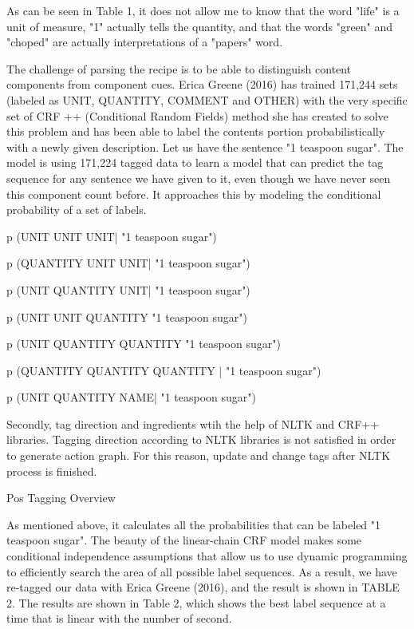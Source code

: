 As can be seen in Table 1, it does not allow me to know that the word "life" is a unit of measure, "1" actually tells the quantity, and that the words "green" and "choped" are actually interpretations of a "papers" word.

The challenge of parsing the recipe is to be able to distinguish content components from component cues. Erica Greene (2016) has trained 171,244 sets (labeled as UNIT, QUANTITY, COMMENT and OTHER) with the very specific set of CRF ++\cite{crf} (Conditional Random Fields) method she has created to solve this problem and has been able to label the contents portion probabilistically with a newly given description. Let us have the sentence "1 teaspoon sugar". The model is using 171,224 tagged data to learn a model that can predict the tag sequence for any sentence we have given to it, even though we have never seen this component count before. It approaches this by modeling the conditional probability of a set of labels.

p (UNIT UNIT UNIT| "1 teaspoon sugar")

p (QUANTITY UNIT UNIT| "1 teaspoon sugar")

p (UNIT QUANTITY UNIT| "1 teaspoon sugar")

p (UNIT UNIT QUANTITY "1 teaspoon sugar")

p (UNIT QUANTITY QUANTITY "1 teaspoon sugar")

p (QUANTITY QUANTITY QUANTITY | "1 teaspoon sugar")

p (UNIT QUANTITY NAME| "1 teaspoon sugar")

Secondly, tag direction and ingredients wtih the help of NLTK \cite{nltk} and CRF++\cite{crf} libraries. Tagging direction according to NLTK \cite{nltk} libraries is not satisfied in order to generate  action graph. For this reason, update and change tags after NLTK \cite{nltk} process is finished. 

\begin{algorithm}
\caption{Pos Tagging Overview}
\label{alg:generator}

\end{algorithm}
As mentioned above, it calculates all the probabilities that can be labeled "1 teaspoon sugar". The beauty of the linear-chain CRF model makes some conditional independence assumptions that allow us to use dynamic programming to efficiently search the area of all possible label sequences. As a result, we have re-tagged our data with Erica Greene (2016), and the result is shown in TABLE 2. The results are shown in Table 2, which shows the best label sequence at a time that is linear with the number of second.


